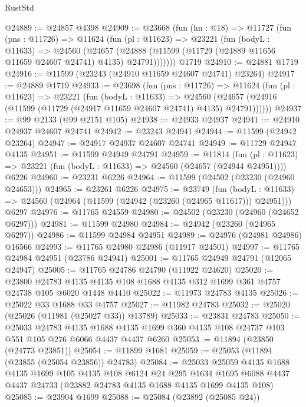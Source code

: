 \begin{lexlean}{RustStd}
\begin{coremodule}
@24889 := @24857 @4398
@24909 := @23668
    (fun (hn : @18) =>
    @11727
      (fun (pns : @11726) =>
      @11624
        (fun (pl : @11623) =>
        @23221
          (fun (bodyL : @11633) =>
          @24560
            (@24657
              (@24888 (@11599 (@11729 (@24889 @11656 @11659 @24607 @24741) @4135) @24791)))))))
    @1719
@24910 := @24881 @1719
@24916 := @11599 (@23243 (@24910 @11659 @24607 @24741) @23264)
@24917 := @24889 @1719
@24933 := @23698
    (fun (pns : @11726) =>
    @11624
      (fun (pl : @11623) =>
      @23221
        (fun (bodyL : @11633) =>
        @24560 (@24657 (@24916 (@11599 (@11729 (@24917 @11659 @24607 @24741) @4135) @24791))))))
@24937 := @99 @2133 (@99 @2151 @105)
@24938 := @24933 @24937
@24941 := @24910 @24937 @24607 @24741
@24942 := @23243 @24941
@24944 := @11599 (@24942 @23264)
@24947 := @24917 @24937 @24607 @24741
@24949 := @11729 @24947 @4135
@24951 := @11599 @24949 @24791
@24959 := @11814
    (fun (pl : @11623) => @23221 (fun (bodyL : @11633) => @24560 (@24657 (@24944 @24951))))
    @6226
@24960 := @23231 @6226
@24964 := @11599 (@24502 (@23230 (@24960 @24653)))
@24965 := @23261 @6226
@24975 := @23749
    (fun (bodyL : @11633) => @24560 (@24964 (@11599 (@24942 (@23260 (@24965 @11617))) @24951)))
    @6297
@24976 := @11765 @24559
@24980 := @24502 (@23230 (@24960 (@24652 @6297)))
@24981 := @11599 @24980
@24984 := @24942 (@23260 (@24965 @6297))
@24986 := @11599 @24984 @24951
@24989 := @24976 (@24981 @24986) @16566
@24993 := @11765 @24980 @24986 (@11917 @24501)
@24997 := @11765 @24984 @24951 (@23786 @24941)
@25001 := @11765 @24949 @24791 (@12065 @24947)
@25005 := @11765 @24786 @24790 (@11922 @24620)
@25020 := @23800
    @24783
    @4135
    @4135
    @108
    @1688
    @4135
    @312
    @1699
    @361
    @4757
    @24738
    @105
    @6020
    @1448
    @4410
@25022 := @11973 @24783 @4135
@25026 := @25022 @33 @1688 @33 @4757
@25027 := @11982 @24783
@25032 := @25020 (@25026 (@11981 (@25027 @33)) @13789)
@25033 := @23831 @24783
@25050 := @25033
    @24783
    @4135
    @1688
    @4135
    @1699
    @360
    @4135
    @108
    @24737
    @103
    @551
    @105
    @276
    @6066
    @4437
    @4437
    @6260
@25053 := @11894 (@23850 (@24773 @23851))
@25054 := @11899 @1681
@25059 := @25053 (@11894 (@23855 (@25054 @23856)) @24783)
@25084 := @25033
    @25059
    @4135
    @1688
    @4135
    @1699
    @105
    @4135
    @108
    @6124
    @24
    @295
    @1634
    @1695
    @6088
    @4437
    @4437
    @24733
    (@23882 @24783 @4135 @1688 @4135 @1699 @4135 @108)
@25085 := @23904 @1699
@25088 := @25084 (@23892 (@25085 @24))

\end{coremodule}
\end{lexlean}
